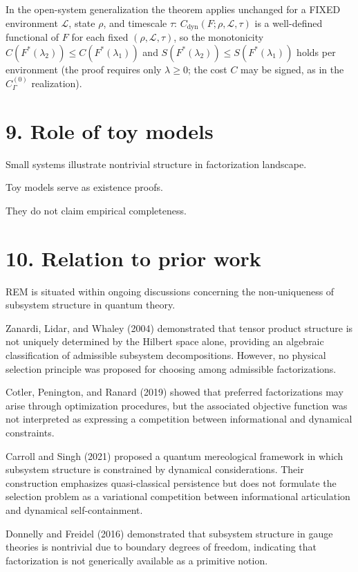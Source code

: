 \documentclass[
]{article}
\begin{document}
In the open-system generalization the theorem applies unchanged for a
FIXED environment $\mathcal L$, state $\rho$, and timescale $\tau$:
$C_{\mathrm{dyn}}(F;\rho,\mathcal L,\tau)$ is a well-defined functional
of $F$ for each fixed $(\rho,\mathcal L,\tau)$, so the monotonicity
$C(F^*(\lambda_2)) \leq C(F^*(\lambda_1))$ and
$S(F^*(\lambda_2)) \leq S(F^*(\lambda_1))$ holds per environment (the
proof requires only $\lambda \geq 0$; the cost $C$ may be signed, as in
the $C_\Gamma^{(0)}$ realization).

\section{9. Role of toy models}\label{role-of-toy-models}

Small systems illustrate nontrivial structure in factorization
landscape.

Toy models serve as existence proofs.

They do not claim empirical completeness.

\section{10. Relation to prior work}\label{relation-to-prior-work}

REM is situated within ongoing discussions concerning the non-uniqueness of subsystem structure in quantum theory.

Zanardi, Lidar, and Whaley (2004) demonstrated that tensor product structure is not uniquely determined by the Hilbert space alone, providing an algebraic classification of admissible subsystem decompositions. However, no physical selection principle was proposed for choosing among admissible factorizations.

Cotler, Penington, and Ranard (2019) showed that preferred factorizations may arise through optimization procedures, but the associated objective function was not interpreted as expressing a competition between informational and dynamical constraints.

Carroll and Singh (2021) proposed a quantum mereological framework in which subsystem structure is constrained by dynamical considerations. Their construction emphasizes quasi-classical persistence but does not formulate the selection problem as a variational competition between informational articulation and dynamical self-containment.

Donnelly and Freidel (2016) demonstrated that subsystem structure in gauge theories is nontrivial due to boundary degrees of freedom, indicating that factorization is not generically available as a primitive notion.
\end{document}
